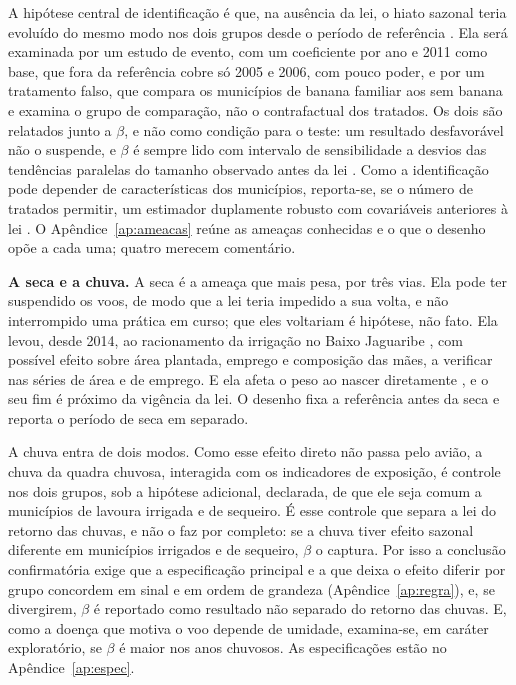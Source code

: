 A hipótese central de identificação é que, na ausência da lei, o hiato sazonal teria
evoluído do mesmo modo nos dois grupos desde o período de referência
\cite{olden2022triple}. Ela será examinada por um estudo de evento, com um
coeficiente por ano e 2011 como base, que fora da referência cobre só 2005 e
2006, com pouco poder, e por um tratamento falso, que compara os municípios de
banana familiar aos sem banana e examina o grupo de comparação, não o
contrafactual dos tratados. Os dois são relatados junto a $\beta$, e não como
condição para o teste: um resultado desfavorável não o suspende, e $\beta$ é
sempre lido com intervalo de sensibilidade a desvios das tendências paralelas do
tamanho observado antes da lei \cite{rambachan2023credible}. Como a
identificação pode depender de características dos municípios, reporta-se, se
o número de tratados permitir, um estimador duplamente robusto com covariáveis
anteriores à lei \cite{ortiz2025triple}. O Apêndice~\ref{ap:ameacas} reúne as
ameaças conhecidas e o que o desenho opõe a cada uma; quatro merecem
comentário.

\textbf{A seca e a chuva.} A seca é a ameaça que mais pesa, por três vias. Ela
pode ter suspendido os voos, de modo que a lei teria impedido a sua volta, e
não interrompido uma prática em curso; que eles voltariam é hipótese, não
fato. Ela levou, desde 2014, ao racionamento da irrigação no Baixo Jaguaribe
\cite{pereira2015conflitos}, com possível efeito sobre área plantada, emprego
e composição das mães, a verificar nas séries de área e de emprego. E ela
afeta o peso ao nascer diretamente \cite{rocha2015water}, e o seu fim é
próximo da vigência da lei. O desenho fixa a referência antes da seca e
reporta o período de seca em separado.

A chuva entra de dois modos. Como esse efeito direto não passa pelo avião, a
chuva da quadra chuvosa, interagida com os indicadores de exposição, é
controle nos dois grupos, sob a hipótese adicional, declarada, de que ele seja
comum a municípios de lavoura irrigada e de sequeiro. É esse controle que
separa a lei do retorno das chuvas, e não o faz por completo: se a chuva tiver efeito sazonal diferente em
municípios irrigados e de sequeiro, $\beta$ o captura. Por isso a conclusão
confirmatória exige que a especificação principal e a que deixa o efeito
diferir por grupo concordem em sinal e em ordem de grandeza
(Apêndice~\ref{ap:regra}), e, se divergirem, $\beta$ é reportado como
resultado não separado do retorno das chuvas. E, como a doença que motiva o
voo depende de umidade, examina-se, em caráter exploratório, se $\beta$ é
maior nos anos chuvosos. As especificações estão no Apêndice~\ref{ap:espec}.

